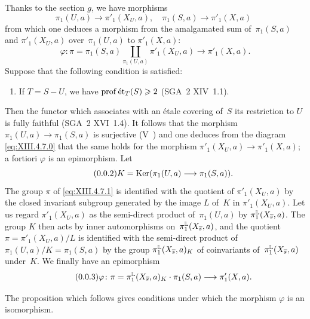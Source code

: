 Thanks to the section $g$, we have morphisms
$$\pi_1(U,a)\to\pi'_1(X_U,a),\quad \pi_1(S,a)\to\pi'_1(X,a)\,\;$$
from which one
deduces a morphism from the amalgamated sum of~$\pi_1(S,a)$ and
$\pi'_1(X_U,a)$ over~$\pi_1(U,a)$ to $\pi'_1(X,a)$:
\begin{equation*}
\label{eq:XIII.4.7.1} \tag{\thesubsection.1} {}
\varphi\colon\pi=\pi_1(S,a)\coprod_{\pi_1(U,a)}\pi'_1(X_U,a)\to\pi'_1(X,a).
\end{equation*}
Suppose that the following condition is satisfied:
\begin{enumerate}
\item[c)] If $T=S-U$, we have $\operatorname{prof} \mathrm{\acute{e}t}_T(S)\geqslant 2$ (SGA~2 XIV~1.1).
\end{enumerate}
Then the functor which associates with an \'etale covering of~$S$
its restriction to $U$ is fully faithful
(SGA~2 XVI~1.4). It follows that the morphism
$\pi_1(U,a)\to\pi_1(S,a)$ is surjective (V~) and one
deduces from the
diagram \eqref{eq:XIII.4.7.0} that the same holds for the morphism
$\pi'_1(X_U,a)\to\pi'_1(X,a)$; a fortiori $\varphi$ is an
epimorphism. Let
\begin{equation*}
\label{eq:XIII.4.7.2} \tag{\thesubsection.2} {}
K=\Ker(\pi_1(U,a)\to\pi_1(S,a)).
\end{equation*}
The group $\pi$ of \eqref{eq:XIII.4.7.1} is identified with the quotient of
$\pi'_1(X_U,a)$ by the closed invariant subgroup generated
by the image $L$ of~$K$ in $\pi'_1(X_U,a)$. Let us regard
$\pi'_1(X_U,a)$ as the semi-direct product of~$\pi_1(U,a)$ by
$\pi_1^{\mathbb{L}} (X_{\overline{s}},a)$. The group $K$ then acts by
inner automorphisms on~$\pi_1^{\mathbb{L}} (X_{\overline{s}},a)$, and the
quotient $\pi=\pi'_1(X_U,a)/L$ is identified with the semi-direct product of
$\pi_1(U,a)/K=\pi_1(S,a)$ by the group $\pi_1^{\mathbb{L}}(X_{\overline{s}},a)_K$
of coinvariants of~$\pi_1^{\mathbb{L}}(X_{\overline{s}},a)$ under~$K$. We
finally have an epimorphism
\begin{equation*}
\label{eq:XIII.4.7.3} \tag{\thesubsection.3} {}
\varphi\colon\pi=\pi_1^\LL(X_{\bar{s}},a)_K\cdot\pi_1(S,a)\to\pi'_1(X,a).
\end{equation*}

The proposition which follows gives conditions under which the
morphism $\varphi$ is an isomorphism.

\setcounter{subsubsection}{3}


